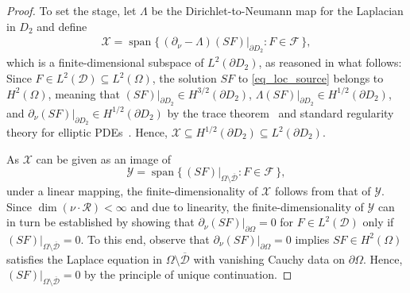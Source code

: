 \documentclass[reqno]{amsart}
\numberwithin{equation}{section}
\numberwithin{figure}{section}
\numberwithin{table}{section}
\newcommand{\D}{\mathcal{D}}
\newcommand{\p}{\partial}
\theoremstyle{definition}
\theoremstyle{plain}
\theoremstyle{definition}
\theoremstyle{remark}
\numberwithin{equation}{section}
\begin{document}
\begin{proof}
	To set the stage, let $\Lambda$ be the Dirichlet-to-Neumann map for the Laplacian in $D_2$ and define
	\begin{align*}
		\mathcal{X} = \operatorname{span} \{\, (\partial_\nu  - \Lambda )(S F)|_{\partial D_2} : F \in \mathcal F \,\},
	\end{align*}
	which is a finite-dimensional subspace of $L^{2}(\partial D_2)$, as reasoned in what follows: Since $F \in L^2(\D) \subseteq L^2(\Omega)$, the solution $SF$ to \eqref{eq_loc_source} belongs to $H^2(\Omega)$, meaning that $(S F)|_{\partial D_2} \in H^{3/2}(\p D_2 )$, $\Lambda (S F)|_{\partial D_2} \in H^{1/2}(\partial D_2)$, and  $\partial_\nu (S F)|_{\partial D_2} \in H^{1/2}(\partial D_2)$ by the trace theorem~\cite{Adams75} and standard regularity theory for elliptic PDEs~\cite{Grisvard85}. Hence, $\mathcal{X} \subseteq H^{1/2}(\partial D_2) \subseteq L^2(\partial D_2)$. 
	
	As $\mathcal{X}$ can be given as an image of 
	\begin{equation*}
		\mathcal{Y} = \operatorname{span}  \{\, (S F)|_{\Omega \setminus \overline{\D}} : F \in \mathcal F \,\},
	\end{equation*}
	under a linear mapping, the finite-dimensionality of $\mathcal{X}$ follows from that of $\mathcal{Y}$. Since $\dim (\nu \cdot \mathcal{R}) < \infty$ and due to linearity, the finite-dimensionality of $\mathcal{Y}$ can in turn be established by showing that  $\partial_\nu (SF)|_{\partial \Omega} = 0$ for $F \in L^2(\D)$ only if $(SF)|_{\Omega \setminus \overline{\D}} = 0$. To this end, observe that $\partial_\nu (SF)|_{\partial \Omega} = 0$ implies $SF \in H^2(\Omega)$ satisfies the Laplace equation in $\Omega \setminus \overline{\D}$ with vanishing Cauchy data on $\partial \Omega$.  Hence, $(S F)|_{\Omega \setminus \overline{\D}} = 0$ by the principle of unique continuation.  
	 

\end{proof}
\end{document}
